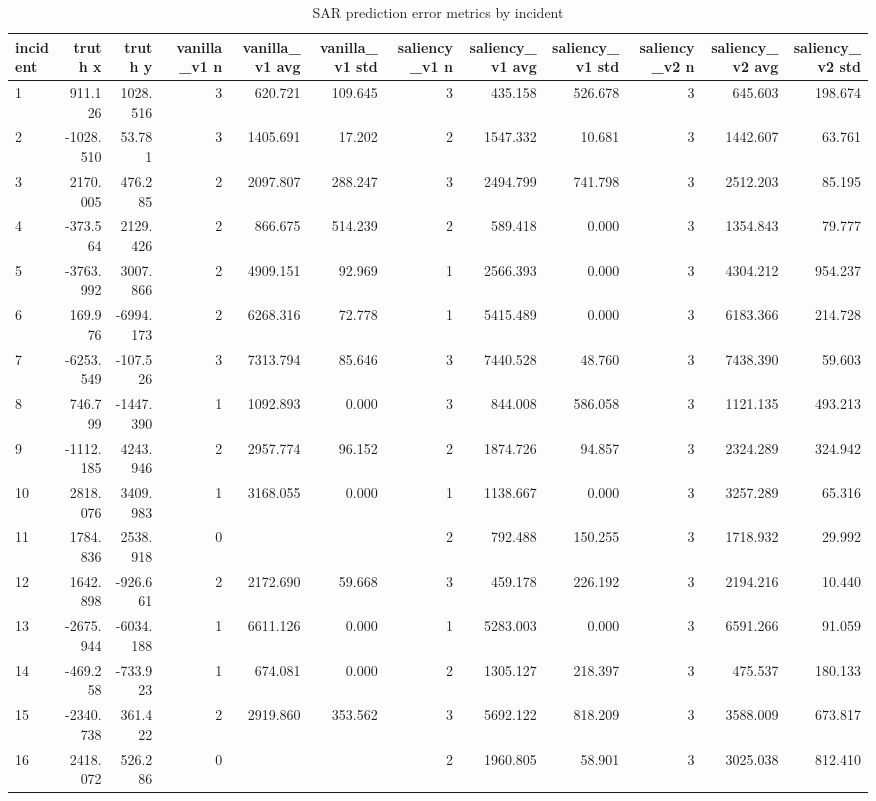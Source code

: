 \begin{table}[ht]
\centering
\caption{SAR prediction error metrics by incident}
\label{tab:sar-incident-errors}
\begin{tabular}{lrrrrrrrrrrr}
\hline
incident & truth x & truth y & vanilla\_v1 n & vanilla\_v1 avg & vanilla\_v1 std & saliency\_v1 n & saliency\_v1 avg & saliency\_v1 std & saliency\_v2 n & saliency\_v2 avg & saliency\_v2 std \\
\hline
1 & 911.126 & 1028.516 & 3 & 620.721 & 109.645 & 3 & 435.158 & 526.678 & 3 & 645.603 & 198.674 \\
2 & -1028.510 & 53.781 & 3 & 1405.691 & 17.202 & 2 & 1547.332 & 10.681 & 3 & 1442.607 & 63.761 \\
3 & 2170.005 & 476.285 & 2 & 2097.807 & 288.247 & 3 & 2494.799 & 741.798 & 3 & 2512.203 & 85.195 \\
4 & -373.564 & 2129.426 & 2 & 866.675 & 514.239 & 2 & 589.418 & 0.000 & 3 & 1354.843 & 79.777 \\
5 & -3763.992 & 3007.866 & 2 & 4909.151 & 92.969 & 1 & 2566.393 & 0.000 & 3 & 4304.212 & 954.237 \\
6 & 169.976 & -6994.173 & 2 & 6268.316 & 72.778 & 1 & 5415.489 & 0.000 & 3 & 6183.366 & 214.728 \\
7 & -6253.549 & -107.526 & 3 & 7313.794 & 85.646 & 3 & 7440.528 & 48.760 & 3 & 7438.390 & 59.603 \\
8 & 746.799 & -1447.390 & 1 & 1092.893 & 0.000 & 3 & 844.008 & 586.058 & 3 & 1121.135 & 493.213 \\
9 & -1112.185 & 4243.946 & 2 & 2957.774 & 96.152 & 2 & 1874.726 & 94.857 & 3 & 2324.289 & 324.942 \\
10 & 2818.076 & 3409.983 & 1 & 3168.055 & 0.000 & 1 & 1138.667 & 0.000 & 3 & 3257.289 & 65.316 \\
11 & 1784.836 & 2538.918 & 0 &  &  & 2 & 792.488 & 150.255 & 3 & 1718.932 & 29.992 \\
12 & 1642.898 & -926.661 & 2 & 2172.690 & 59.668 & 3 & 459.178 & 226.192 & 3 & 2194.216 & 10.440 \\
13 & -2675.944 & -6034.188 & 1 & 6611.126 & 0.000 & 1 & 5283.003 & 0.000 & 3 & 6591.266 & 91.059 \\
14 & -469.258 & -733.923 & 1 & 674.081 & 0.000 & 2 & 1305.127 & 218.397 & 3 & 475.537 & 180.133 \\
15 & -2340.738 & 361.422 & 2 & 2919.860 & 353.562 & 3 & 5692.122 & 818.209 & 3 & 3588.009 & 673.817 \\
16 & 2418.072 & 526.286 & 0 &  &  & 2 & 1960.805 & 58.901 & 3 & 3025.038 & 812.410 \\

\end{tabular}
\end{table}
